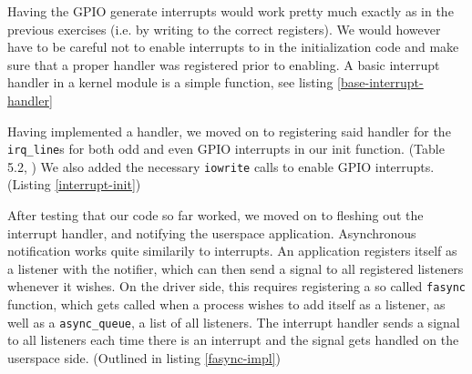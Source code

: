 Having the GPIO generate interrupts would work pretty much exactly as in the previous exercises (i.e. by writing to the correct registers). We would however have to be careful not to enable interrupts to in the initialization code and make sure that a proper handler was registered prior to enabling. A basic interrupt handler in a kernel module is a simple function, see listing \ref{base-interrupt-handler}


Having implemented a handler, we moved on to registering said handler for the \texttt{irq\_line}s for both odd and even GPIO interrupts in our init function. (Table 5.2, \cite[p.~57]{compendium}) We also added the necessary \texttt{iowrite} calls to enable GPIO interrupts. (Listing \ref{interrupt-init})


After testing that our code so far worked, we moved on to fleshing out the interrupt handler, and notifying the userspace application. Asynchronous notification works quite similarily to interrupts. An application registers itself as a listener with the notifier, which can then send a signal to all registered listeners whenever it wishes. On the driver side, this requires registering a so called \texttt{fasync} function, which gets called when a process wishes to add itself as a listener, as well as a \texttt{async\_queue}, a list of all listeners. The interrupt handler sends a signal to all listeners each time there is an interrupt and the signal gets handled on the userspace side. (Outlined in listing \ref{fasync-impl})

